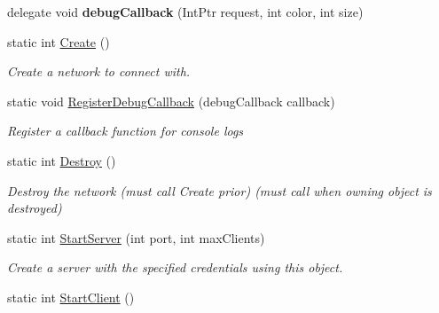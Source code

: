 \begin{DoxyCompactItemize}
\item 
\hypertarget{class_champ_net_plugin_1_1_network_plugin_a73ca302732b2b578ca661979f1ea6606}{delegate void {\bfseries debug\-Callback} (Int\-Ptr request, int color, int size)}\label{class_champ_net_plugin_1_1_network_plugin_a73ca302732b2b578ca661979f1ea6606}

\item 
\hypertarget{class_champ_net_plugin_1_1_network_plugin_a31e10e1a10604f04a8f8cbaeabff311b}{static int \hyperlink{class_champ_net_plugin_1_1_network_plugin_a31e10e1a10604f04a8f8cbaeabff311b}{Create} ()}\label{class_champ_net_plugin_1_1_network_plugin_a31e10e1a10604f04a8f8cbaeabff311b}

\begin{DoxyCompactList}\small\item\em Create a network to connect with. \end{DoxyCompactList}\item 
static void \hyperlink{class_champ_net_plugin_1_1_network_plugin_afbc9579060d47c7825a33ccd71c791ee}{Register\-Debug\-Callback} (debug\-Callback callback)
\begin{DoxyCompactList}\small\item\em Register a callback function for console logs \end{DoxyCompactList}\item 
\hypertarget{class_champ_net_plugin_1_1_network_plugin_aea8dfdc44c010919eb61a23c203224f9}{static int \hyperlink{class_champ_net_plugin_1_1_network_plugin_aea8dfdc44c010919eb61a23c203224f9}{Destroy} ()}\label{class_champ_net_plugin_1_1_network_plugin_aea8dfdc44c010919eb61a23c203224f9}

\begin{DoxyCompactList}\small\item\em Destroy the network (must call Create prior) (must call when owning object is destroyed) \end{DoxyCompactList}\item 
\hypertarget{class_champ_net_plugin_1_1_network_plugin_a6da04c7618f00dad124d344e57f2e54f}{static int \hyperlink{class_champ_net_plugin_1_1_network_plugin_a6da04c7618f00dad124d344e57f2e54f}{Start\-Server} (int port, int max\-Clients)}\label{class_champ_net_plugin_1_1_network_plugin_a6da04c7618f00dad124d344e57f2e54f}

\begin{DoxyCompactList}\small\item\em Create a server with the specified credentials using this object. \end{DoxyCompactList}\item 
\hypertarget{class_champ_net_plugin_1_1_network_plugin_a637460ae0b046802a771697744e657c4}{static int \hyperlink{class_champ_net_plugin_1_1_network_plugin_a637460ae0b046802a771697744e657c4}{Start\-Client} ()}\label{class_champ_net_plugin_1_1_network_plugin_a637460ae0b046802a771697744e657c4}


\end{DoxyCompactItemize}

